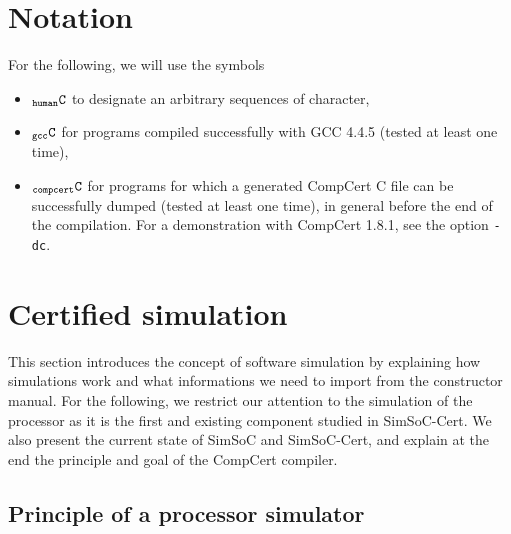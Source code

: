 \documentclass[a4paper, 11pt]{article}
\newcommand{\C}{$_{\tt compcert}{\tt C}$\xspace}
\newcommand{\gccC}{$_{\tt gcc}{\tt C}$\xspace}
\newcommand{\hC}{$_{\tt human}{\tt C}$\xspace}
\newcommand{\simsoc}{SimSoC\xspace}
\newcommand{\SScert}{SimSoC-Cert\xspace}
\begin{document}
\section*{Notation}
For the following, we will use the symbols
\begin{itemize}
\item \hC to designate an arbitrary sequences of character, 
\item \gccC for programs compiled successfully with GCC 4.4.5 (tested at least one time),
\item \C for programs for which a generated CompCert C file can be successfully dumped (tested at least one time), in general before the end of the compilation. For a demonstration with CompCert 1.8.1, see the option \verb|-dc|.
\end{itemize}

\section{Certified simulation}
\label{s:certi_sim}

This section introduces the concept of software simulation by explaining how simulations work and what informations we need to import from the constructor manual. For the following, we restrict our attention to the simulation of the processor as it is the first and existing component studied in \SScert. We also present the current state of \simsoc and \SScert, and explain at the end the principle and goal of the CompCert compiler.

\subsection{Principle of a processor simulator}

\end{document}
